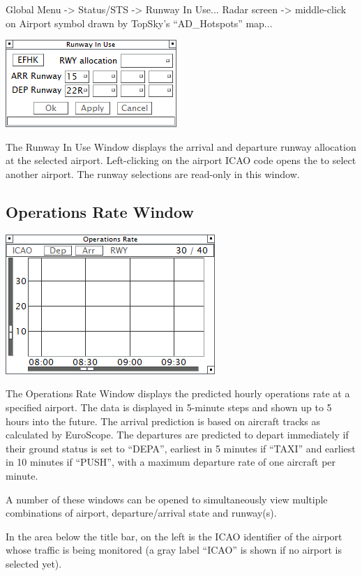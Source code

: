 \documentclass[11pt,a4paper,oldfontcommands]{memoir}
\begin{document}
Global Menu -> Status/STS -> Runway In Use...
Radar screen -> middle-click on Airport symbol drawn by TopSky’s “AD\_Hotspots” map...

\includegraphics{img/rwy.png}

The Runway In Use Window displays the arrival and departure runway allocation at the selected airport. Left-clicking on the airport ICAO code opens the \textit{} to select another airport. The runway selections are read-only in this window.

\subsection{Operations Rate Window}
\label{win:orw}

\includegraphics{img/opsrate.png}

The Operations Rate Window displays the predicted hourly operations rate at a specified airport. The data is displayed in 5-minute steps and shown up to 5 hours into the future. The arrival prediction is based on aircraft tracks as calculated by EuroScope. The departures are predicted to depart immediately if their ground status is set to “DEPA”, earliest in 5 minutes if “TAXI” and earliest in 10 minutes if “PUSH”, with a maximum departure rate of one aircraft per minute.

A number of these windows can be opened to simultaneously view multiple combinations of airport, departure/arrival state and runway(s).

In the area below the title bar, on the left is the ICAO identifier of the airport whose traffic is being monitored (a gray label “ICAO” is shown if no airport is selected yet).
\end{document}
